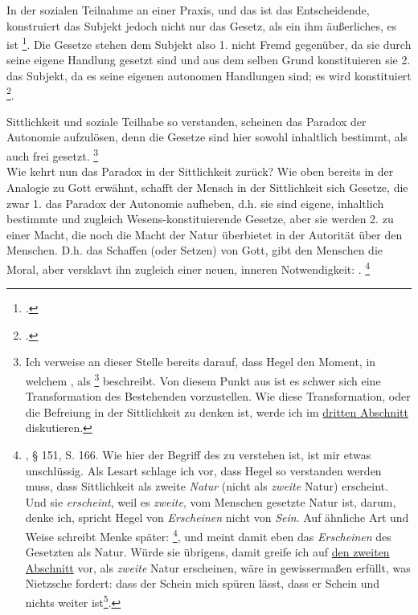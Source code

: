 \documentclass[12pt, a4paper, openany]{report}
\begin{document}
In der sozialen Teilnahme an einer Praxis, und das ist das Entscheidende, konstruiert das Subjekt jedoch nicht nur das Gesetz, als ein ihm äußerliches, es ist \footcite[][§ 147, S. 162.]{hegel_grundlinien_2017}.
Die Gesetze stehen dem Subjekt also 1. nicht Fremd gegenüber, da sie durch seine eigene Handlung gesetzt sind und aus dem selben Grund konstituieren sie 2. das Subjekt, da es seine eigenen autonomen Handlungen sind;
es wird konstituiert \footcite[][30]{menke_autonomie_2018}.

Sittlichkeit und soziale Teilhabe so verstanden, scheinen das Paradox der Autonomie aufzulösen, denn die Gesetze sind hier sowohl inhaltlich bestimmt, als auch frei gesetzt.%
\footnote{
    Ich verweise an dieser Stelle bereits darauf, dass Hegel den Moment, in welchem , als \footcite[][§ 147 A, S. 163.]{hegel_grundlinien_2017} beschreibt. 
    Von diesem Punkt aus ist es schwer sich eine Transformation des Bestehenden vorzustellen.
    Wie diese Transformation, oder die Befreiung in der Sittlichkeit zu denken ist, werde ich im \hyperref[abschnitt_3]{dritten Abschnitt} diskutieren.
}\\

Wie kehrt nun das Paradox in der Sittlichkeit zurück? 
Wie oben bereits in der Analogie zu Gott erwähnt, schafft der Mensch in der Sittlichkeit sich Gesetze, die zwar 1. das Paradox der Autonomie aufheben, d.h. sie sind eigene, inhaltlich bestimmte und zugleich Wesens-konstituierende Gesetze, aber sie werden 2. zu einer Macht, die noch die Macht der Natur überbietet in der Autorität über den Menschen.
D.h. das Schaffen (oder Setzen) von Gott, gibt den Menschen die Moral, aber versklavt ihn zugleich einer neuen, inneren Notwendigkeit: .%
\footnote{\cite{hegel_grundlinien_2017}, § 151, S. 166.
    Wie hier der Begriff des  zu verstehen ist, ist mir etwas unschlüssig. 
    Als Lesart schlage ich vor, dass Hegel so verstanden werden muss, dass Sittlichkeit als zweite \emph{Natur} (nicht als \emph{zweite} Natur) erscheint. 
    Und sie \emph{erscheint}, weil es \emph{zweite}, vom Menschen gesetzte Natur ist, darum, denke ich, spricht Hegel von \emph{Erscheinen} nicht von \emph{Sein}.
    Auf ähnliche Art und Weise schreibt Menke später: \footcite[][142]{menke_autonomie_2018}, und meint damit eben das \emph{Erscheinen} des Gesetzten als Natur.
    Würde sie übrigens, damit greife ich auf \hyperref[abschnitt_2]{den zweiten Abschnitt} vor, als \emph{zweite} Natur erscheinen, wäre in gewissermaßen erfüllt, was Nietzsche fordert: 
    dass der Schein mich spüren lässt, dass er Schein und nichts weiter ist\footcite[Vlg.][416.]{nietzsche_morgenrote_1999}.
}
\end{document}
